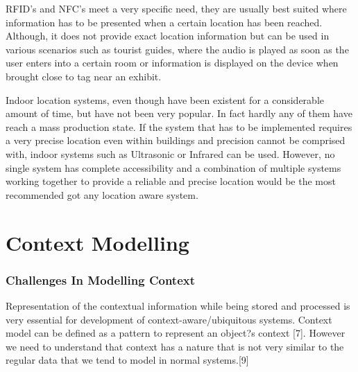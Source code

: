 \documentclass[12pt]{report}
\begin{document}
RFID's and NFC's meet a very specific need, they are usually best suited where information has to be presented when a certain location has been reached. Although, it does not provide exact location information but can be used in various scenarios such as tourist guides, where the audio is played as soon as the user enters into a certain room or information is displayed on the device when brought close to tag near an exhibit.


Indoor location systems, even though have been existent for a considerable amount of time, but have not been very popular. In fact hardly any of them have reach a mass production state. If the system that has to be implemented requires a very precise location even within buildings and precision cannot be comprised with, indoor systems such as Ultrasonic or Infrared can be used. However, no single system has complete accessibility and a combination of multiple systems working together to provide a reliable and precise location would be the most recommended got any location aware system.

\chapter{Context Modelling}
\subsection{Challenges In Modelling Context}

Representation of the contextual information while being stored and processed is very essential for development of context-aware/ubiquitous systems. Context model can be defined as a pattern to represent an object?s context [7]. However we need to understand that context has a nature that is not very similar to the regular data that we tend to model in normal systems.[9]
\end{document}
